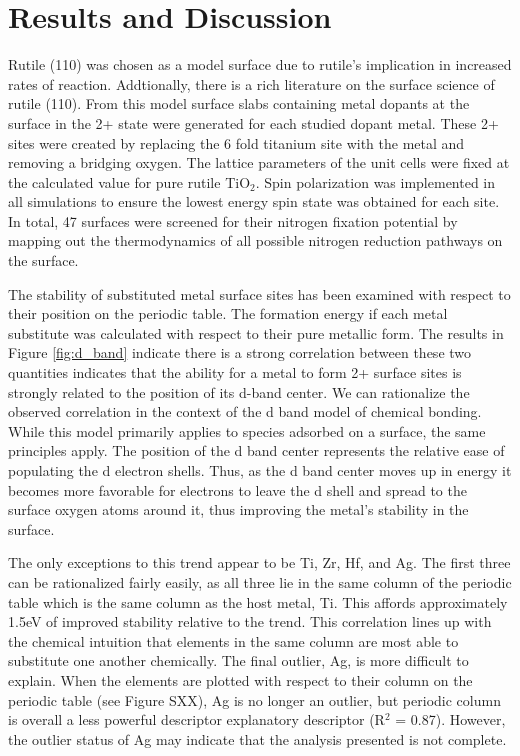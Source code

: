\documentclass[catalysts,article,submit,moreauthors,pdftex,10pt,a4paper]{mdpi}
\theoremstyle{mdpi}
\newcounter{ex}
\newcounter{re}
\theoremstyle{mdpidefinition}
\begin{document}
\section{Results and Discussion}
Rutile (110) was chosen as a model surface due to rutile's implication in increased rates of reaction.\cite{Schrauzer_1977} Addtionally, there is a rich literature on the surface science of rutile (110)\cite{Diebold2003,Yates_1991,Lu1994,Walle2009}. From this model surface slabs containing metal dopants at the surface in the 2+ state were generated for each studied dopant metal. These 2+ sites were created by replacing the 6 fold titanium site with the metal and removing a bridging oxygen. The lattice parameters of the unit cells were fixed at the calculated value for pure rutile TiO$_2$. Spin polarization was implemented in all simulations to ensure the lowest energy spin state was obtained for each site. In total, 47  surfaces were screened for their nitrogen fixation potential by mapping out the thermodynamics of all possible nitrogen reduction pathways on the surface.

The stability of substituted metal surface sites has been examined with respect to their position on the periodic table. The formation energy if each metal substitute was calculated with respect to their pure metallic form. The results in Figure \ref{fig:d_band} indicate there is a strong correlation between these two quantities indicates that the ability for a metal to form 2+ surface sites is strongly related to the position of its d-band center. We can rationalize the observed correlation in the context of the d band model of chemical bonding. While this model primarily applies to species adsorbed on a surface, the same principles apply. The position of the d band center represents the relative ease of populating the d electron shells. Thus, as the d band center moves up in energy it becomes more favorable for electrons to leave the d shell and spread to the surface oxygen atoms around it, thus improving the metal's stability in the surface.

The only exceptions to this trend appear to be Ti, Zr, Hf, and Ag. The first three can be rationalized fairly easily, as all three lie in the same column of the periodic table which is the same column as the host metal, Ti. This affords approximately 1.5eV of improved stability relative to the trend. This correlation lines up with the chemical intuition that elements in the same column are most able to substitute one another chemically. The final outlier, Ag, is more difficult to explain. When the elements are plotted with respect to their column on the periodic table (see Figure SXX), Ag is no longer an outlier, but periodic column is overall a less powerful descriptor explanatory descriptor (R$^2$ = 0.87). However, the outlier status of Ag may indicate that the analysis presented is not complete.
\end{document}
